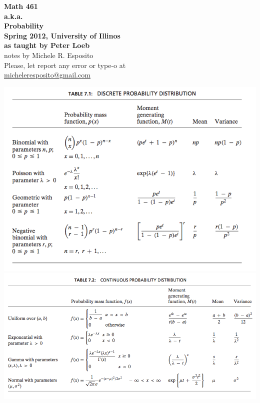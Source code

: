 \documentclass[a4paper]{article}
\begin{document}
\begin{center}

{\bf{\huge Math 461 }}\\
\vspace{ 0.5 cm }
{\bf{\huge a.k.a. }}\\
\vspace{ 0.5 cm }
{\bf{\huge Probability }}\\
\vspace{ 5 cm }
{\bf{\large Spring 2012, University of Illinos}}\\
{\bf{\large as taught by Peter Loeb}}\\
\vspace{ 1 cm }                         
{\large notes by Michele R. Esposito}\\
\vspace{ 5cm }
Please, let report any error or type-o at\\
\underline{\href{mailto:micheleresposito@gmail.com}{ micheleresposito@gmail.com }}
\end{center}
\newpage
\tableofcontents
\newpage

\includegraphics[scale=.50]{table1.png} \\
\includegraphics[scale=.50]{table2.png}
\end{document}
